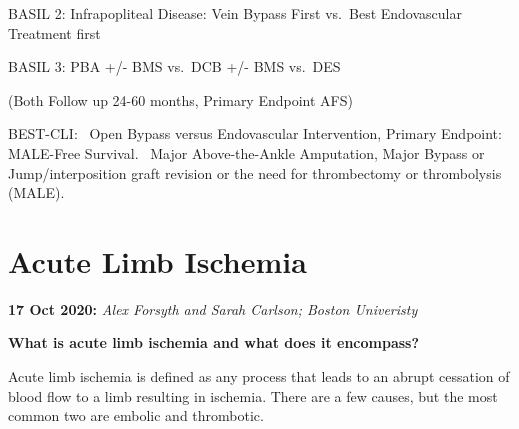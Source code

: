 \documentclass[
]{book}
\begin{document}
BASIL 2: Infrapopliteal Disease: Vein Bypass First vs.~Best Endovascular
Treatment first

BASIL 3: PBA +/- BMS vs.~DCB +/- BMS vs.~DES

(Both Follow up 24-60 months, Primary Endpoint AFS)

BEST-CLI:~ Open Bypass versus Endovascular Intervention, Primary
Endpoint: MALE-Free Survival.~ Major Above-the-Ankle Amputation, Major
Bypass or Jump/interposition graft revision or the need for thrombectomy
or thrombolysis (MALE).

\hypertarget{acute-limb-ischemia}{%
\section{Acute Limb Ischemia}\label{acute-limb-ischemia}}

\textbf{17 Oct 2020:} \emph{Alex Forsyth and Sarah Carlson; Boston Univeristy}

\textbf{What is acute limb ischemia and what does it encompass?}

Acute limb ischemia is defined as any process that leads to an abrupt
cessation of blood flow to a limb resulting in ischemia. There are a few
causes, but the most common two are embolic and thrombotic.
\end{document}
